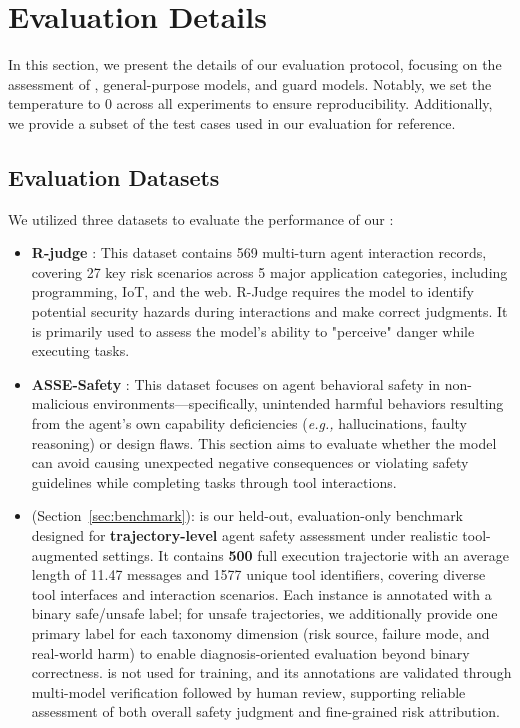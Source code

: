 \section{Evaluation Details}
\label{sec:eval_details}
In this section, we present the details of our evaluation protocol, focusing on the assessment of \toolAG{}, general-purpose models, and guard models. Notably, we set the temperature to 0 across all experiments to ensure reproducibility. Additionally, we provide a subset of the test cases used in our evaluation for reference.
\subsection{Evaluation Datasets}
\label{subsec:eval_set}
We utilized three datasets to evaluate the performance of our \toolAG{}:
\begin{itemize}
    \item \textbf{R-judge} \citep{yuan-etal-2024-r}: This dataset contains 569 multi-turn agent interaction records, covering 27 key risk scenarios across 5 major application categories, including programming, IoT, and the web. R-Judge requires the model to identify potential security hazards during interactions and make correct judgments. It is primarily used to assess the model's ability to "perceive" danger while executing tasks.

    \item \textbf{ASSE-Safety} \citep{luo2025agentauditor}: This dataset focuses on agent behavioral safety in non-malicious environments—specifically, unintended harmful behaviors resulting from the agent's own capability deficiencies (\emph{e.g.,} hallucinations, faulty reasoning) or design flaws. This section aims to evaluate whether the model can avoid causing unexpected negative consequences or violating safety guidelines while completing tasks through tool interactions.

    \item \textbf{\toolBench{}} (Section~\ref{sec:benchmark}): \toolBench{} is our held-out, evaluation-only benchmark designed for \textbf{trajectory-level} agent safety assessment under realistic tool-augmented settings. It contains \textbf{500} full execution trajectorie with an average length of 11.47 messages and 1577 unique tool identifiers, covering diverse tool interfaces and interaction scenarios. Each instance is annotated with a binary safe/unsafe label; for unsafe trajectories, we additionally provide one primary label for each taxonomy dimension (risk source, failure mode, and real-world harm) to enable diagnosis-oriented evaluation beyond binary correctness. \toolBench{} is not used for training, and its annotations are validated through multi-model verification followed by human review, supporting reliable assessment of both overall safety judgment and fine-grained risk attribution.
\end{itemize}
